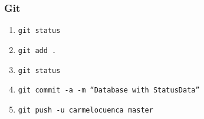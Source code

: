\begin{frame}[fragile]
\frametitle{Git}
\begin{enumerate}
\item \texttt{git status}
\item \texttt{git add .}
\item \texttt{git status}
\item \texttt{git commit -a -m ``Database with StatusData''}
\item \texttt{git push -u carmelocuenca master}
\end{enumerate}

\end{frame}
